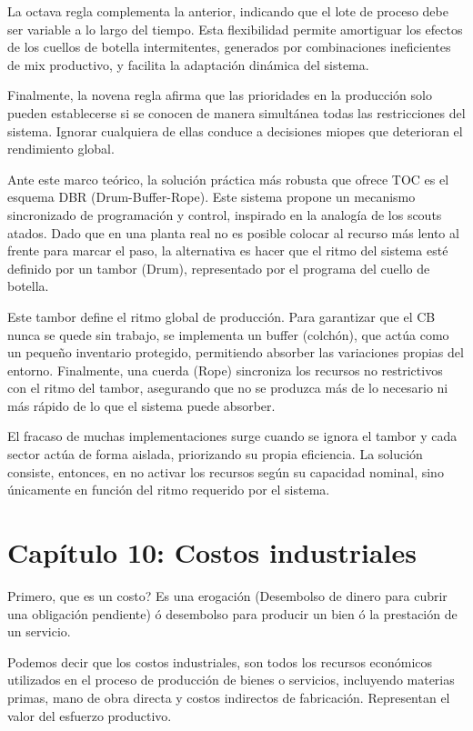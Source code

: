 \documentclass[a4paper,oneside,11pt]{article}
\begin{document}
La octava regla complementa la anterior, indicando que el lote de proceso debe ser variable a lo largo del tiempo. Esta flexibilidad permite amortiguar los efectos de los cuellos de botella intermitentes, generados por combinaciones ineficientes de mix productivo, y facilita la adaptación dinámica del sistema.

Finalmente, la novena regla afirma que las prioridades en la producción solo pueden establecerse si se conocen de manera simultánea todas las restricciones del sistema. Ignorar cualquiera de ellas conduce a decisiones miopes que deterioran el rendimiento global.

Ante este marco teórico, la solución práctica más robusta que ofrece TOC es el esquema DBR (Drum-Buffer-Rope). Este sistema propone un mecanismo sincronizado de programación y control, inspirado en la analogía de los scouts atados. Dado que en una planta real no es posible colocar al recurso más lento al frente para marcar el paso, la alternativa es hacer que el ritmo del sistema esté definido por un tambor (Drum), representado por el programa del cuello de botella.

Este tambor define el ritmo global de producción. Para garantizar que el CB nunca se quede sin trabajo, se implementa un buffer (colchón), que actúa como un pequeño inventario protegido, permitiendo absorber las variaciones propias del entorno. Finalmente, una cuerda (Rope) sincroniza los recursos no restrictivos con el ritmo del tambor, asegurando que no se produzca más de lo necesario ni más rápido de lo que el sistema puede absorber.

El fracaso de muchas implementaciones surge cuando se ignora el tambor y cada sector actúa de forma aislada, priorizando su propia eficiencia. La solución consiste, entonces, en no activar los recursos según su capacidad nominal, sino únicamente en función del ritmo requerido por el sistema.

\clearpage

\section{Capítulo 10: Costos industriales}

Primero, que es un costo? Es una erogación (Desembolso de dinero para cubrir una obligación pendiente) ó desembolso para producir un bien ó la prestación de un servicio.

Podemos decir que los costos industriales, son todos los recursos económicos utilizados en el proceso de producción de bienes o servicios, incluyendo materias primas, mano de obra directa y costos indirectos de fabricación. Representan el valor del esfuerzo productivo.
\end{document}
